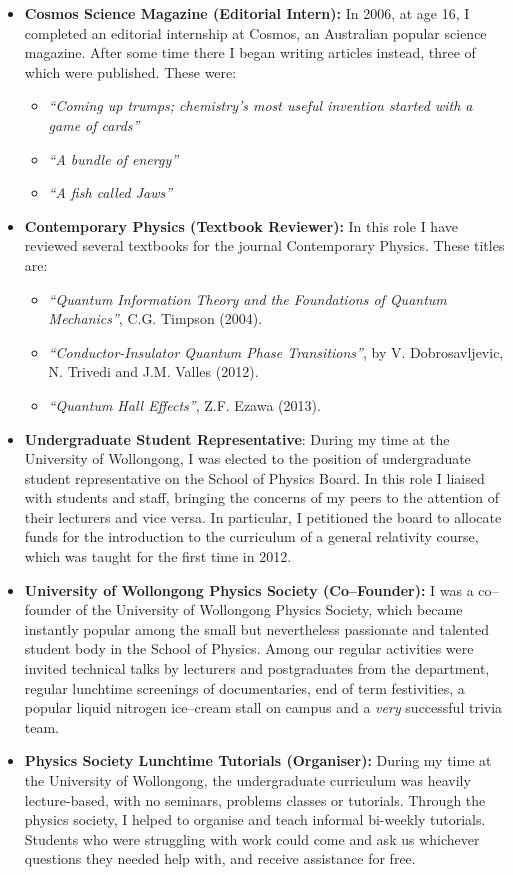 \documentclass[11pt,a4paper,sans]{moderncv}        %
\begin{document}
\small{\begin{itemize}
\item \textbf{Cosmos Science Magazine (Editorial Intern):} In 2006, at age 16, I completed an editorial internship at Cosmos, an Australian popular science magazine. After some time there I began writing articles instead, three of which were published. These were:
\begin{itemize}
\item \textit{``Coming up trumps; chemistry's most useful invention started with a game of cards''}
\item \textit{``A bundle of energy''}
\item \textit{``A fish called Jaws''}
\end{itemize}
\item \textbf{Contemporary Physics (Textbook Reviewer):} In this role I have reviewed several textbooks for the journal Contemporary Physics. These titles are:
\begin{itemize}
\item \textit{``Quantum Information Theory and the Foundations of Quantum Mechanics''}, C.G.  Timpson (2004).
\item \textit{``Conductor-Insulator Quantum Phase Transitions''}, by V. Dobrosavljevic, N. Trivedi and J.M. Valles (2012).
\item \textit{``Quantum Hall Effects''}, Z.F. Ezawa (2013).
\end{itemize}
\item{\textbf{Undergraduate Student Representative}: During my time at the University of Wollongong, I was elected to the position of undergraduate student representative on the School of Physics Board. In this role I liaised with students and staff, bringing the concerns of my peers to the attention of their lecturers and vice versa. In particular, I petitioned the board to allocate funds for the introduction to the curriculum of a general relativity course, which was taught for the first time in 2012.}
\item{\textbf{University of Wollongong Physics Society (Co--Founder):} I was a co--founder of the University of Wollongong Physics Society, which became instantly popular among the small but nevertheless passionate and talented student body in the School of Physics. Among our regular activities were invited technical talks by lecturers and postgraduates from the department, regular lunchtime screenings of documentaries, end of term festivities, a popular liquid nitrogen ice--cream stall on campus and a \textit{very} successful trivia team.}
\item{\textbf{Physics Society Lunchtime Tutorials (Organiser):} During my time at the University of Wollongong, the undergraduate curriculum was heavily lecture-based, with no seminars, problems classes or tutorials. Through the physics society, I helped to organise and teach informal bi-weekly tutorials. Students who were struggling with work could come and ask us whichever questions they needed help with, and receive assistance for free.}
\end{itemize}}
\end{document}

